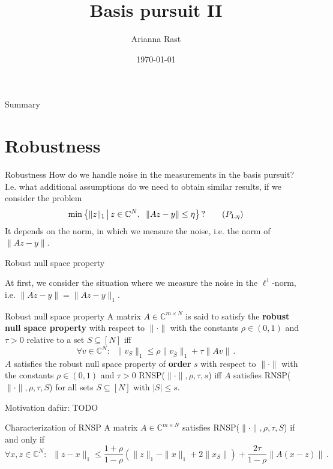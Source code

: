 \documentclass[11pt]{beamer}
\author[Autor]{Arianna Rast}
\title{Basis pursuit II}
\institute[]{LMU Munich}
\date{\today}
\newcommand{\CC}{\mathbb{C}}
\renewcommand{\emph}{\textbf}
\begin{document}
\begin{frame}
\titlepage
\end{frame}

\begin{frame}{Summary}
\tableofcontents 
\end{frame}

\section{Robustness}

\begin{frame}{Robustness}
 How do we handle noise in the measurements in the basis pursuit? I.e. what additional assumptions do we need to obtain similar results, if we consider the problem
 \[\min\left\{\|z\|_1\,\big|\,z\in \CC^N,\;\;\|Az-y\|\le \eta\right\}\,?\tag{$P_{1,\eta}$}\]
 It depends on the norm, in which we measure the noise, i.e. the norm of \(\|Az-y\|\).
\end{frame}


\begin{frame}{Robust null space property}

    At first, we consider the situation where we measure the noise in the \(\ell^1\)-norm, i.e. \(\|Az-y\|=\|Az-y\|_1\).
    \begin{Def}
    {Robust null space property}{} A matrix \(A\in\CC^{m\times N}\) is said to satisfy the \emph{robust null space property} with respect to \(\|\cdot\|\) with the constants \(\rho\in (0,1)\) and \(\tau>0\) relative to a set \(S\subseteq[N]\) iff
    \[\forall v\in \CC^N:\;\; \|v_S\|_1\le \rho\|v_{\overline S}\|_1+\tau \|Av\|\,.\tag{RNSP($\|\cdot\|,\rho,\tau,S$)}\]
    \(A \) satisfies the robust null space property of \emph{order} \(s\) with respect to \(\|\cdot\|\) with the constants \(\rho\in (0,1)\) and \(\tau>0\) RNSP(\(\|\cdot\|,\rho,\tau, s\)) iff \(A \) satisfies RNSP(\(\|\cdot\|,\rho,\tau,S\)) for all sets \(S\subseteq[N]\) with \(|S|\le s\).
    \end{Def}
\end{frame}

\begin{frame}{}
    Motivation dafür: TODO
    \begin{Satzz}
    {Characterization of RNSP}{}
    A matrix \(A\in\CC^{m\times N}\) satisfies RNSP(\(\|\cdot\|,\rho,\tau,S\)) if and only if 
    \[\forall x,z\in \CC^N:\;\; \|z-x\|_1\le \frac{1+\rho}{1-\rho}(\|z\|_1-\|x\|_1+2\|x_S\|)+\frac{2\tau}{1-\rho}\|A(x-z)\|\,.\]
    \end{Satzz}

\end{frame}
\end{document}
